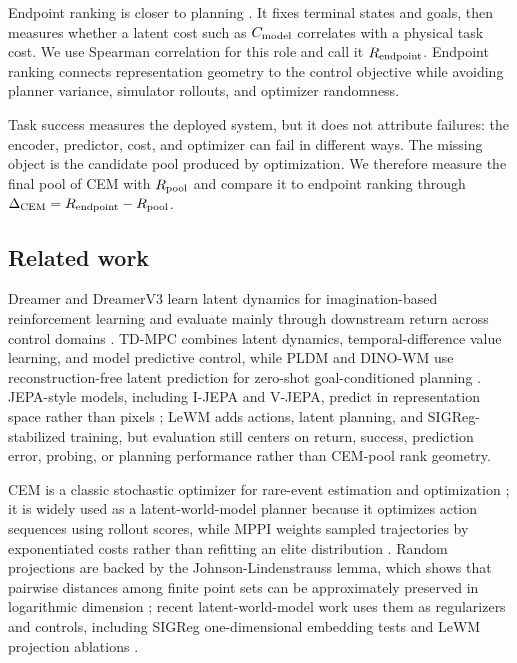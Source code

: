 Endpoint ranking is closer to planning \citep{planningeval2023, endpointmetrics2024}. It fixes terminal states and goals, then measures whether a latent cost such as $C_\text{model}$ correlates with a physical task cost. We use Spearman correlation for this role and call it $R_\text{endpoint}$. Endpoint ranking connects representation geometry to the control objective while avoiding planner variance, simulator rollouts, and optimizer randomness.

Task success measures the deployed system, but it does not attribute failures: the encoder, predictor, cost, and optimizer can fail in different ways. The missing object is the candidate pool produced by optimization. We therefore measure the final pool of CEM with $R_\text{pool}$ and compare it to endpoint ranking through $\Delta_\text{CEM}=R_\text{endpoint}-R_\text{pool}$.

\subsection{Related work}

Dreamer and DreamerV3 learn latent dynamics for imagination-based reinforcement learning and evaluate mainly through downstream return across control domains \citep{dreamer2020,dreamerv3_2023}. TD-MPC combines latent dynamics, temporal-difference value learning, and model predictive control, while PLDM and DINO-WM use reconstruction-free latent prediction for zero-shot goal-conditioned planning \citep{tdmpc2022,pldm2024,zhou2024dinowm}. JEPA-style models, including I-JEPA and V-JEPA, predict in representation space rather than pixels \citep{lecun2022,ijepa2023,vjepa2024}; LeWM adds actions, latent planning, and SIGReg-stabilized training, but evaluation still centers on return, success, prediction error, probing, or planning performance rather than CEM-pool rank geometry.

CEM is a classic stochastic optimizer for rare-event estimation and optimization \citep{cem1999}; it is widely used as a latent-world-model planner because it optimizes action sequences using rollout scores, while MPPI weights sampled trajectories by exponentiated costs rather than refitting an elite distribution \citep{mppi2017}. Random projections are backed by the Johnson-Lindenstrauss lemma, which shows that pairwise distances among finite point sets can be approximately preserved in logarithmic dimension \citep{jl1984}; recent latent-world-model work uses them as regularizers and controls, including SIGReg one-dimensional embedding tests and LeWM projection ablations \citep{sigr2024,lewm2025}.
